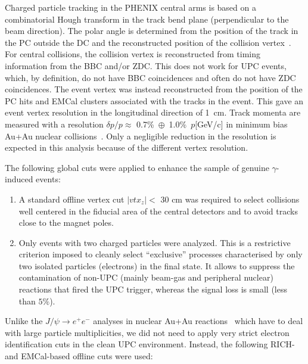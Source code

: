 \documentclass[dvipdfm]{elsart}
\providecommand{\jpsi}{J/\psi}
\begin{document}
Charged particle tracking in the PHENIX central arms is based on a 
combinatorial Hough transform in the track bend plane (perpendicular to the 
beam direction). The polar angle is determined from the position of the track 
in the PC outside the DC and the reconstructed position of the collision 
vertex~\cite{Mitchell:2002wu}. For central collisions, the collision vertex 
is reconstructed from timing information from the BBC and/or ZDC. This does 
not work for UPC events, which, by definition, do not have BBC coincidences 
and often do not have ZDC coincidences. The event vertex was instead 
reconstructed from the position of the PC hits and EMCal clusters associated 
with the tracks in the event. This gave an event vertex resolution in the 
longitudinal direction of 1~cm. Track momenta are measured with a resolution 
$\delta p/p \approx$ 0.7\%~$\oplus$~1.0\%~$p$[GeV/c] in minimum bias Au+Au 
nuclear collisions~\cite{Adler:2003rc}. Only a negligible reduction in the 
resolution is expected in this analysis because of the different vertex 
resolution.

The following global cuts were applied to enhance the sample of genuine 
$\gamma$-induced events:
\begin{enumerate}

\item A standard offline vertex cut $|vtx_{z}| <$ 30 cm was required to 
select collisions well centered in the fiducial area of the central detectors 
and to avoid tracks close to the magnet poles.

\item Only events with two charged particles were analyzed. This is a 
restrictive criterion imposed to cleanly select ``exclusive'' processes 
characterised by only two isolated particles (electrons) in the final state. 
It allows to suppress the contamination of non-UPC (mainly beam-gas and 
peripheral nuclear) reactions that fired the UPC trigger, whereas the signal 
loss is small (less than $5\%$).

\end{enumerate}

Unlike the $\jpsi\rightarrow e^+e^-$ analyses in nuclear Au+Au 
reactions~\cite{Adler:2003rc,Adare:2006ns} which have to deal with large 
particle multiplicities, we did not need to apply very strict electron 
identification cuts in the clean UPC environment. Instead, the following 
RICH- and EMCal-based offline cuts were used:
\end{document}
